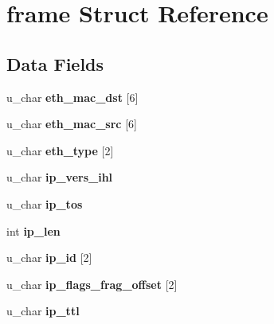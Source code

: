 \hypertarget{structframe}{}\section{frame Struct Reference}
\label{structframe}
\subsection*{Data Fields}
\begin{DoxyCompactItemize}
\item 
\hypertarget{structframe_a2891038240ffc1f30d7760f3caf152f2}{}u\+\_\+char {\bfseries eth\+\_\+mac\+\_\+dst} \mbox{[}6\mbox{]}\label{structframe_a2891038240ffc1f30d7760f3caf152f2}

\item 
\hypertarget{structframe_a153f4ad7db316fb79f32c270a42c8f6e}{}u\+\_\+char {\bfseries eth\+\_\+mac\+\_\+src} \mbox{[}6\mbox{]}\label{structframe_a153f4ad7db316fb79f32c270a42c8f6e}

\item 
\hypertarget{structframe_a0a930cfc929ad3cf439f8900e7bae943}{}u\+\_\+char {\bfseries eth\+\_\+type} \mbox{[}2\mbox{]}\label{structframe_a0a930cfc929ad3cf439f8900e7bae943}

\item 
\hypertarget{structframe_ac1a26e2d381d0956605213148be7b897}{}u\+\_\+char {\bfseries ip\+\_\+vers\+\_\+ihl}\label{structframe_ac1a26e2d381d0956605213148be7b897}

\item 
\hypertarget{structframe_a6097ab4474472b66fbbb546ab0322a84}{}u\+\_\+char {\bfseries ip\+\_\+tos}\label{structframe_a6097ab4474472b66fbbb546ab0322a84}

\item 
\hypertarget{structframe_aa97e9334141b9ad8bb9360e85e243c85}{}int {\bfseries ip\+\_\+len}\label{structframe_aa97e9334141b9ad8bb9360e85e243c85}

\item 
\hypertarget{structframe_a9c0f0b0a8d520a10119b64b637cfa4e3}{}u\+\_\+char {\bfseries ip\+\_\+id} \mbox{[}2\mbox{]}\label{structframe_a9c0f0b0a8d520a10119b64b637cfa4e3}

\item 
\hypertarget{structframe_a9c491aa26fedd0023a21b3903d3eeb04}{}u\+\_\+char {\bfseries ip\+\_\+flags\+\_\+frag\+\_\+offset} \mbox{[}2\mbox{]}\label{structframe_a9c491aa26fedd0023a21b3903d3eeb04}

\item 
\hypertarget{structframe_aa896428334563659f7eb3daf21bc961a}{}u\+\_\+char {\bfseries ip\+\_\+ttl}\label{structframe_aa896428334563659f7eb3daf21bc961a}


\end{DoxyCompactItemize}
